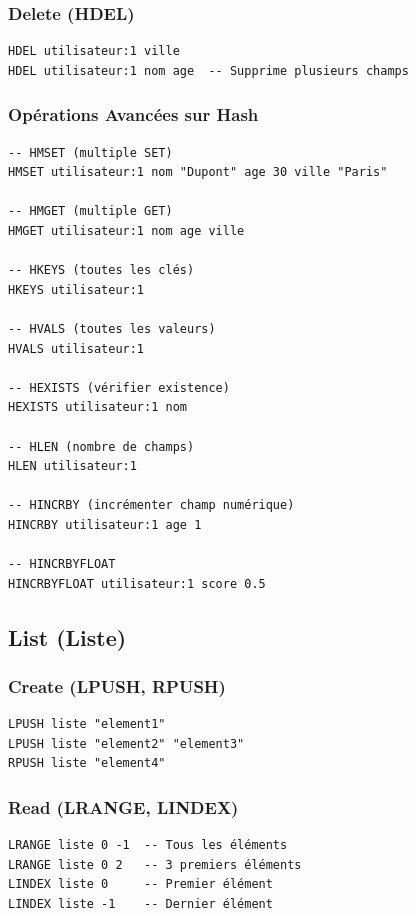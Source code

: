 \documentclass[11pt,a4paper]{article}
\begin{document}
\subsubsection{Delete (HDEL)}

\begin{lstlisting}
HDEL utilisateur:1 ville
HDEL utilisateur:1 nom age  -- Supprime plusieurs champs
\end{lstlisting}

\subsubsection{Opérations Avancées sur Hash}

\begin{lstlisting}
-- HMSET (multiple SET)
HMSET utilisateur:1 nom "Dupont" age 30 ville "Paris"

-- HMGET (multiple GET)
HMGET utilisateur:1 nom age ville

-- HKEYS (toutes les clés)
HKEYS utilisateur:1

-- HVALS (toutes les valeurs)
HVALS utilisateur:1

-- HEXISTS (vérifier existence)
HEXISTS utilisateur:1 nom

-- HLEN (nombre de champs)
HLEN utilisateur:1

-- HINCRBY (incrémenter champ numérique)
HINCRBY utilisateur:1 age 1

-- HINCRBYFLOAT
HINCRBYFLOAT utilisateur:1 score 0.5
\end{lstlisting}

\subsection{List (Liste)}

\subsubsection{Create (LPUSH, RPUSH)}

\begin{lstlisting}
LPUSH liste "element1"
LPUSH liste "element2" "element3"
RPUSH liste "element4"
\end{lstlisting}

\subsubsection{Read (LRANGE, LINDEX)}

\begin{lstlisting}
LRANGE liste 0 -1  -- Tous les éléments
LRANGE liste 0 2   -- 3 premiers éléments
LINDEX liste 0     -- Premier élément
LINDEX liste -1    -- Dernier élément
\end{lstlisting}
\end{document}
